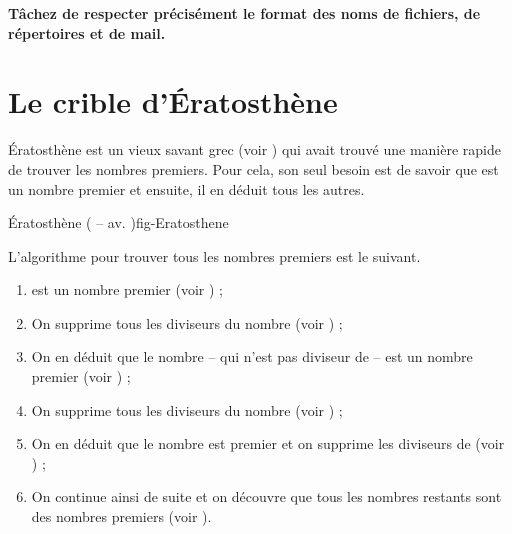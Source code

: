 \documentclass[a4paper]{article}
\begin{document}
			\textbf{Tâchez de respecter précisément le format des noms de fichiers, de répertoires et de mail.}
		
			\newpage

	\section{Le crible d'Ératosthène}
		Ératosthène est un vieux savant grec (voir ) qui avait trouvé une manière rapide de trouver les nombres premiers.
		Pour cela, son seul besoin est de savoir que  est un nombre premier et ensuite, il en déduit tous les autres.

		\begin{Figure}{Ératosthène ( --  av. )}{fig-Eratosthene}
		\end{Figure}

		L'algorithme pour trouver tous les nombres premiers est le suivant.
		\begin{enumerate}
			\item {} est un nombre premier (voir ) ;
			\item On supprime tous les diviseurs du nombre  (voir ) ;
			\item On en déduit que le nombre  -- qui n'est pas diviseur de  -- est un nombre premier (voir ) ;
			\item On supprime tous les diviseurs du nombre  (voir ) ;
			\item On en déduit que le nombre  est premier et on supprime les diviseurs de  (voir ) ;
			\item On continue ainsi de suite et on découvre que tous les nombres restants sont des nombres premiers (voir ).
		\end{enumerate}
\end{document}

